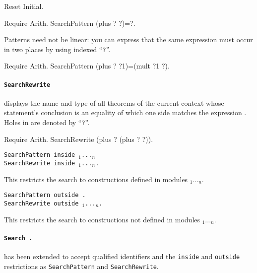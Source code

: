 \documentclass[11pt]{article}
\begin{document}
\begin{coq_eval}
Reset Initial.
\end{coq_eval}
\begin{coq_example}
Require Arith.
SearchPattern (plus ? ?)=?.
\end{coq_example}

Patterns need not be linear: you can express that the same
expression must occur in two places by using indexed ``{\tt ?}''.

\begin{coq_example}
Require Arith.
SearchPattern (plus ? ?1)=(mult ?1 ?).
\end{coq_example}

\paragraph{{\tt SearchRewrite {\term}}}
displays the name and type of all theorems of the current
context whose statement's conclusion is an equality of which one side matches
the expression {\term}. Holes in {\term} are denoted by ``{\tt ?}''.

\begin{coq_example}
Require Arith.
SearchRewrite (plus ? (plus ? ?)).
\end{coq_example}

\begin{Variants}

\item {\tt SearchPattern {\term} inside {\module$_1$}...{\module$_n$}}\\
{\tt SearchRewrite {\term} inside
{\module$_1$}...{\module$_n$}.}

  This restricts the search to constructions defined in modules {\module$_1$}...{\module$_n$}.

\item {\tt SearchPattern {\term} outside {\module}.}\\
{\tt SearchRewrite {\term} outside {\module$_1$}...{\module$_n$}.}

  This restricts the search to constructions not defined in modules {\module$_1$}...{\module$_n$}.

\end{Variants}

\paragraph{{\tt Search {\ident}.}} has been extended to accept qualified
identifiers and the {\tt inside} and {\tt outside} restrictions as
{\tt SearchPattern} and {\tt SearchRewrite}.
\end{document}
